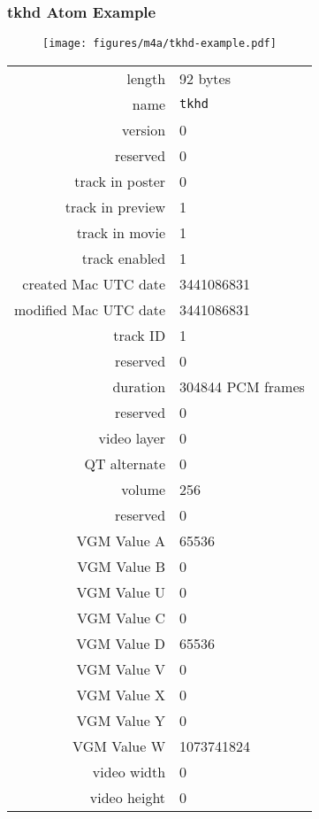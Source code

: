 \subsubsection{tkhd Atom Example}
\begin{figure}[h]
  \texttt{[image: figures/m4a/tkhd-example.pdf]}
\end{figure}
\par
\noindent
\begin{tabular}{rl}
  \textsf{length} & 92 bytes \\
  \textsf{name} & \texttt{tkhd} \\
  \textsf{version} & 0 \\
  \textsf{reserved} & 0 \\
  \textsf{track in poster} & 0 \\
  \textsf{track in preview} & 1 \\
  \textsf{track in movie} & 1 \\
  \textsf{track enabled} & 1 \\
  \textsf{created Mac UTC date} & 3441086831 \\
  \textsf{modified Mac UTC date} & 3441086831 \\
  \textsf{track ID} & 1 \\
  \textsf{reserved} & 0 \\
  \textsf{duration} & 304844 PCM frames \\
  \textsf{reserved} & 0 \\
  \textsf{video layer} & 0 \\
  \textsf{QT alternate} & 0 \\
  \textsf{volume} & 256 \\
  \textsf{reserved} & 0 \\
  \textsf{VGM Value A} & 65536 \\
  \textsf{VGM Value B} & 0 \\
  \textsf{VGM Value U} & 0 \\
  \textsf{VGM Value C} & 0 \\
  \textsf{VGM Value D} & 65536 \\
  \textsf{VGM Value V} & 0 \\
  \textsf{VGM Value X} & 0 \\
  \textsf{VGM Value Y} & 0 \\
  \textsf{VGM Value W} & 1073741824 \\
  \textsf{video width} & 0 \\
  \textsf{video height} & 0 \\
\end{tabular}


